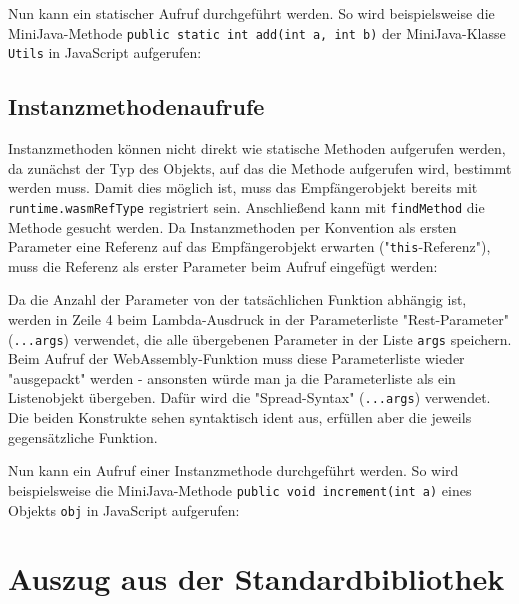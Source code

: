 

Nun kann ein statischer Aufruf durchgeführt werden. So wird beispielsweise die Mini\-Java-Methode \lstinline{public static int add(int a, int b)} der MiniJava-Klasse \lstinline{Utils} in Java\-Script aufgerufen:



\subsection{Instanzmethodenaufrufe}

Instanzmethoden können nicht direkt wie statische Methoden aufgerufen werden, da zunächst der Typ des Objekts, auf das die Methode aufgerufen wird, bestimmt werden muss. Damit dies möglich ist, muss das Empfängerobjekt bereits mit \lstinline{runtime.wasmRefType} registriert sein. Anschließend kann mit \lstinline{findMethod} die Methode gesucht werden. Da Instanzmethoden per Konvention als ersten Parameter eine Referenz auf das Empfängerobjekt erwarten ("\lstinline{this}-Referenz"), muss die Referenz als erster Parameter beim Aufruf eingefügt werden:



Da die Anzahl der Parameter von der tatsächlichen Funktion abhängig ist, werden in Zeile 4 beim Lambda-Ausdruck in der Parameterliste "Rest-Parameter" (\lstinline{...args}) \cite{MDNJavaScript} verwendet, die alle übergebenen Parameter in der Liste \lstinline{args} speichern. Beim Aufruf der WebAssembly-Funktion muss diese Parameterliste wieder "ausgepackt" werden - ansonsten würde man ja die Parameterliste als ein Listenobjekt übergeben. Dafür wird die "Spread-Syntax" (\lstinline{...args}) verwendet. Die beiden Konstrukte sehen syntaktisch ident aus, erfüllen aber die jeweils gegensätzliche Funktion.

Nun kann ein Aufruf einer Instanzmethode durchgeführt werden. So wird beispielsweise die MiniJava-Methode \lstinline{public void increment(int a)} eines Objekts \lstinline{obj} in JavaScript aufgerufen:



\section{Auszug aus der Standardbibliothek}
